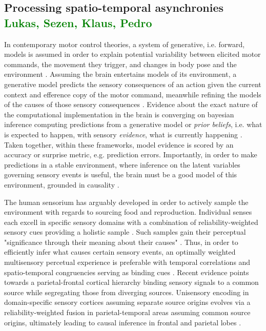 \subsection{Processing spatio-temporal asynchronies \textcolor{green}{Lukas, Sezen, Klaus, Pedro}}
In contemporary motor control theories, a system of generative, i.e. forward, models is assumed in order to explain potential variability between elicited motor commands, the movement they trigger, and changes in body pose and the environment \cite{Wolpert2011, Shadmehr2010}. Assuming the brain entertains models of its environment, a generative model predicts the sensory consequences of an action given the current context and efference copy of the motor command, meanwhile refining the models of the causes of those sensory consequences \cite{Pearson2011, Friston2010, Friston2016a}. Evidence about the exact nature of the computational implementation in the brain is converging on bayesian inference computing predictions from a generative model or \textit{prior beliefs}, i.e. what is expected to happen, with sensory \textit{evidence}, what is currently happening \cite{Knill2004}. Taken together, within these frameworks, model evidence is scored by an accuracy or surprise metric, e.g. prediction errors. Importantly, in order to make predictions in a stable environment, where inference on the latent variables governing sensory events is useful, the brain must be a good model of this environment, grounded in causality \cite{Friston2016a}.

The human sensorium has arguably developed in order to actively sample the environment with regards to sourcing food and reproduction. Individual senses each excell in specific sensory domains with a combination of reliability-weighted sensory cues providing a holistic sample \cite{Fetsch2012, Cao2019}. Such samples gain their perceptual "significance through their meaning about their causes" \cite{Kording2007}. Thus, in order to efficiently infer what causes certain sensory events, an optimally weighted multisensory percetual experience is preferable with temporal correlations and spatio-temporal congruencies serving as binding cues \cite{Robertson2003}. Recent evidence points towards a parietal-frontal cortical hierarchy binding sensory signals to a common source while segregating those from diverging sources. Unisensory encoding in domain-specific sensory cortices assuming separate source origins evolves via a reliability-weighted fusion in parietal-temporal areas assuming common source origins, ultimately leading to causal inference in frontal and parietal lobes \cite{Cao2019, Rohe2019}.

